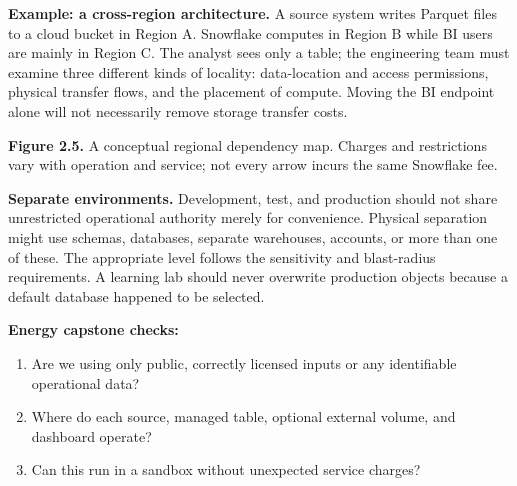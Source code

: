 \documentclass[11pt,twoside]{article}
\begin{document}
\textbf{Example: a cross-region architecture.} A source system writes Parquet files to a cloud bucket in Region A. Snowflake computes in Region B while BI users are mainly in Region C. The analyst sees only a table; the engineering team must examine three different kinds of locality: data-location and access permissions, physical transfer flows, and the placement of compute. Moving the BI endpoint alone will not necessarily remove storage transfer costs.

\begin{center}
\end{center}
{\small\color{inkgray}\textbf{Figure 2.5.} A conceptual regional dependency map. Charges and restrictions vary with operation and service; not every arrow incurs the same Snowflake fee.}\par

\textbf{Separate environments.} Development, test, and production should not share unrestricted operational authority merely for convenience. Physical separation might use schemas, databases, separate warehouses, accounts, or more than one of these. The appropriate level follows the sensitivity and blast-radius requirements. A learning lab should never overwrite production objects because a default database happened to be selected.

\textbf{Energy capstone checks:}
\begin{enumerate}
\item Are we using only public, correctly licensed inputs or any identifiable operational data?
\item Where do each source, managed table, optional external volume, and dashboard operate?
\item Can this run in a sandbox without unexpected service charges?
\end{enumerate}
\end{document}
